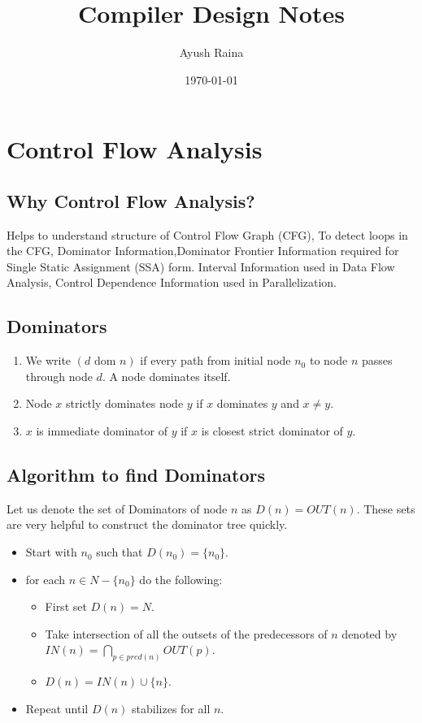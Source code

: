 \documentclass{article}
\title{Compiler Design Notes}
\author{Ayush Raina}
\date{\today}
\begin{document}
\maketitle

\section*{Control Flow Analysis}
\subsection*{Why Control Flow Analysis?}
Helps to understand structure of Control Flow Graph (CFG), To detect loops in the CFG, Dominator Information,Dominator Frontier Information required for Single Static Assignment (SSA) form. Interval Information used in Data Flow Analysis, Control Dependence Information used in Parallelization.

\subsection*{Dominators}
\begin{enumerate}
    \item We write $(d \text{ dom } n)$ if every path from initial node $n_0$ to node $n$ passes through node $d$. A node dominates itself.
    \item Node $x$ strictly dominates node $y$ if $x$ dominates $y$ and $x \neq y$.
    \item $x$ is immediate dominator of $y$ if $x$ is closest strict dominator of $y$.
\end{enumerate}

\subsection*{Algorithm to find Dominators}
Let us denote the set of Dominators of node $n$ as $D(n) = OUT(n)$. These sets are very helpful to construct the dominator tree quickly. 
\begin{itemize}
    \item Start with $n_0$ such that $D(n_0) = \{n_0\}$.
    \item for each $n \in N - \{n_0\}$ do the following:
    \begin{itemize}
        \item First set $D(n) = N$.
        \item Take intersection of all the outsets of the predecessors of $n$ denoted by $IN(n) = \bigcap_{p \in pred(n)} OUT(p)$.
        \item $D(n) = IN(n) \cup \{n\}$.
    \end{itemize}

    \item Repeat until $D(n)$ stabilizes for all $n$.
\end{itemize}
\end{document}
